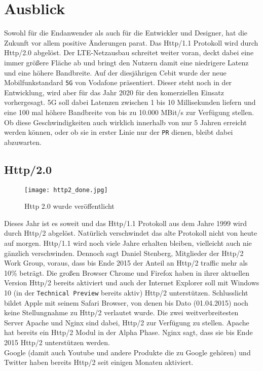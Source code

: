 \section{Ausblick} %
\label{sec:ausblick}
	Sowohl für die Endanwender als auch für die Entwickler und Designer, hat die Zukunft vor allem positive Änderungen parat. Das Http/1.1 Protokoll wird durch Http/2.0 abgelöst. Der LTE-Netzausbau schreitet weiter voran, deckt dabei eine immer größere Fläche ab und bringt den Nutzern damit eine niedrigere Latenz und eine höhere Bandbreite. Auf der diesjährigen Cebit wurde der neue Mobilfunkstandard \texttt{5G} von Vodafone präsentiert. Dieser steht noch in der Entwicklung, wird aber für das Jahr 2020 für den komerziellen Einsatz vorhergesagt. 5G soll dabei Latenzen zwischen 1 bis 10 Millisekunden liefern und eine 100 mal höhere Bandbreite von bis zu 10.000 MBit/s zur Verfügung stellen.\autocite{lte-anbieter15} Ob diese Geschwindigkeiten auch wirklich innerhalb von nur 5 Jahren erreicht werden können, oder ob sie in erster Linie nur der \texttt{PR} dienen, bleibt dabei abzuwarten.

	\subsection{Http/2.0} %
	\label{sub:http_2_0}
		\begin{figure}[htbp]
			\begin{center}
				\texttt{[image: http2\_done.jpg]}
				\caption{Http 2.0 wurde veröffentlicht}
				\label{fig:http2_done}
			\end{center}
		\end{figure}

		Dieses Jahr ist es soweit und das Http/1.1 Protokoll aus dem Jahre 1999 wird durch Http/2 abgelöst. Natürlich verschwindet das alte Protokoll nicht von heute auf morgen. Http/1.1 wird noch viele Jahre erhalten bleiben, vielleicht auch nie gänzlich verschwinden. Dennoch sagt Daniel Stenberg, Mitglieder der Http/2 Work Group, voraus, dass bis Ende 2015 der Anteil an Http/2 traffic mehr als 10\% beträgt.\autocite{stenberg15} Die großen Browser Chrome und Firefox haben in ihrer aktuellen Version Http/2 bereits aktiviert und auch der Internet Explorer soll mit Windows 10 (in der \texttt{Technical Preview} bereits aktiv) Http/2 unterstützen.\autocite{microsoft14} Schlusslicht bildet Apple mit seinem Safari Browser, von denen bis Dato (01.04.2015) noch keine Stellungnahme zu Http/2 verlautet wurde.
		Die zwei weitverbreitesten Server Apache und Nginx sind dabei, Http/2 zur Verfügung zu stellen. Apache hat bereits ein Http/2 Modul in der Alpha Phase. Nginx sagt, dass sie bis Ende 2015 Http/2 unterstützen werden.\\
		Google (damit auch Youtube und andere Produkte die zu Google gehören) und Twitter haben bereits Http/2 seit einigen Monaten aktiviert.

